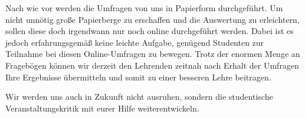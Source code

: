 \begin{multicols}{2}
Nach wie vor werden die Umfragen von uns in Papierform durchgeführt.
Um nicht unnötig große Papierberge zu erschaffen und die Auswertung zu erleichtern, sollen diese doch irgendwann nur noch online durchgeführt werden.
Dabei ist es jedoch erfahrungsgemäß keine leichte Aufgabe, genügend Studenten zur Teilnahme bei diesen Online-Umfragen zu bewegen.
Trotz der enormen Menge an Fragebögen können wir derzeit den Lehrenden zeitnah nach Erhalt der Umfragen Ihre Ergebnisse übermitteln und somit zu einer besseren Lehre beitragen.

Wir werden uns auch in Zukunft nicht ausruhen, sondern die studentische Veranstaltungskritik mit eurer Hilfe weiterentwickeln.

\end{multicols}

